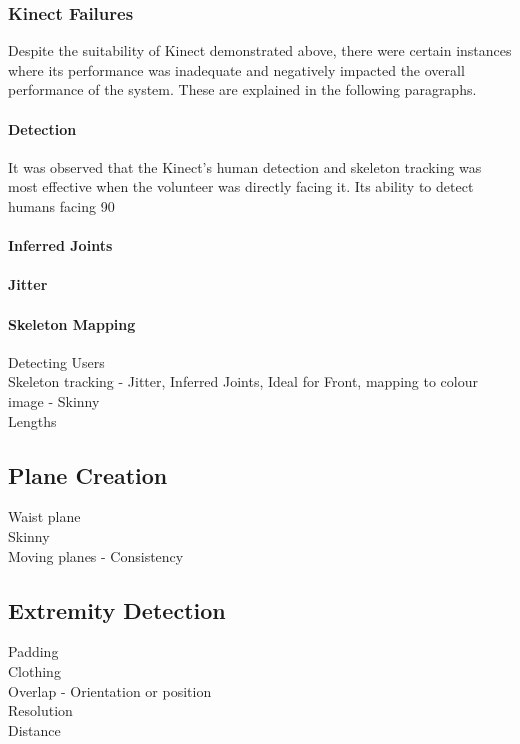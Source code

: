 \subsubsection{Kinect Failures}
Despite the suitability of Kinect demonstrated above, there were certain instances where its performance was inadequate and negatively impacted the overall performance of the system. These are explained in the following paragraphs. 

\paragraph{Detection}
It was observed that the Kinect's human detection and skeleton tracking was most effective when the volunteer was directly facing it. Its ability to detect humans facing 90 \deg

\paragraph{Inferred Joints}

\paragraph{Jitter}

\paragraph{Skeleton Mapping}
Detecting Users\\
Skeleton tracking - Jitter, Inferred Joints, Ideal for Front, mapping to colour image - Skinny\\
Lengths\\


\subsection{Plane Creation}
Waist plane\\
Skinny\\
Moving planes - Consistency\\

\subsection{Extremity Detection}
Padding\\
Clothing\\
Overlap - Orientation or position\\
Resolution\\
Distance\\


